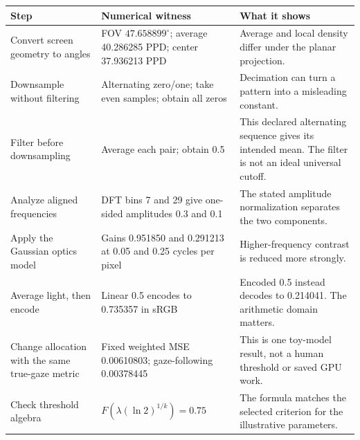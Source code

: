 {\def\LTcaptype{none} %
\begin{longtable}[]{@{}
  >{\raggedright\arraybackslash}p{}
  >{\raggedright\arraybackslash}p{}
  >{\raggedright\arraybackslash}p{}@{}}
\toprule\noalign{}
\begin{minipage}[b]{\linewidth}\raggedright
Step
\end{minipage} & \begin{minipage}[b]{\linewidth}\raggedright
Numerical witness
\end{minipage} & \begin{minipage}[b]{\linewidth}\raggedright
What it shows
\end{minipage} \\
\midrule\noalign{}
\endhead
\bottomrule\noalign{}
\endlastfoot
Convert screen geometry to angles & FOV \(47.658899^\circ\); average 40.286285 PPD; center 37.936213 PPD & Average and local density differ under the planar projection. \\
Downsample without filtering & Alternating zero/one; take even samples; obtain all zeros & Decimation can turn a pattern into a misleading constant. \\
Filter before downsampling & Average each pair; obtain 0.5 & This declared alternating sequence gives its intended mean. The filter is not an ideal universal cutoff. \\
Analyze aligned frequencies & DFT bins 7 and 29 give one-sided amplitudes 0.3 and 0.1 & The stated amplitude normalization separates the two components. \\
Apply the Gaussian optics model & Gains 0.951850 and 0.291213 at 0.05 and 0.25 cycles per pixel & Higher-frequency contrast is reduced more strongly. \\
Average light, then encode & Linear 0.5 encodes to 0.735357 in sRGB & Encoded 0.5 instead decodes to 0.214041. The arithmetic domain matters. \\
Change allocation with the same true-gaze metric & Fixed weighted MSE 0.00610803; gaze-following 0.00378445 & This is one toy-model result, not a human threshold or saved GPU work. \\
Check threshold algebra & \(F\!\left(\lambda(\ln2)^{1/k}\right)=0.75\) & The formula matches the selected criterion for the illustrative parameters. \\
\end{longtable}
}

